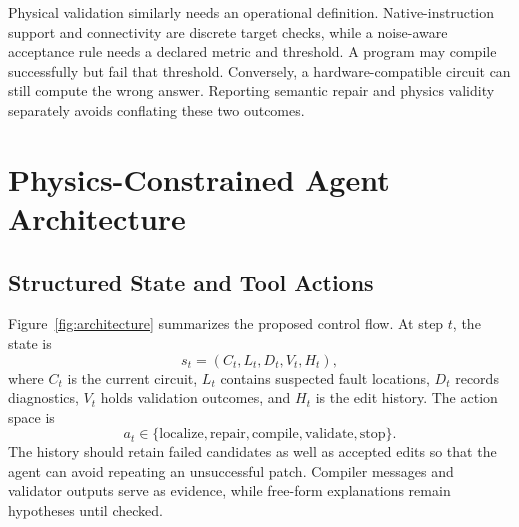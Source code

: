 \documentclass[conference]{IEEEtran}
\begin{document}
Physical validation similarly needs an operational definition. Native-instruction support and connectivity are discrete target checks, while a noise-aware acceptance rule needs a declared metric and threshold. A program may compile successfully but fail that threshold. Conversely, a hardware-compatible circuit can still compute the wrong answer. Reporting semantic repair and physics validity separately avoids conflating these two outcomes.

\section{Physics-Constrained Agent Architecture}
\subsection{Structured State and Tool Actions}
Figure~\ref{fig:architecture} summarizes the proposed control flow. At step $t$, the state is
\begin{equation}
 s_t=(C_t,L_t,D_t,V_t,H_t),
\end{equation}
where $C_t$ is the current circuit, $L_t$ contains suspected fault locations, $D_t$ records diagnostics, $V_t$ holds validation outcomes, and $H_t$ is the edit history. The action space is
\begin{equation}
 a_t\in\{\text{localize},\text{repair},\text{compile},\text{validate},\text{stop}\}.
\end{equation}
The history should retain failed candidates as well as accepted edits so that the agent can avoid repeating an unsuccessful patch. Compiler messages and validator outputs serve as evidence, while free-form explanations remain hypotheses until checked.
\end{document}
